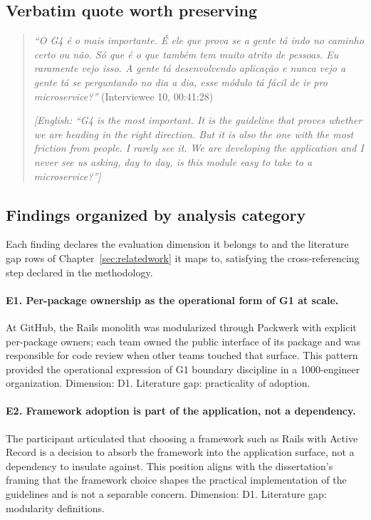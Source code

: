 \subsection*{Verbatim quote worth preserving}

\begin{quote}
\emph{``O G4 é o mais importante. É ele que prova se a gente tá indo no caminho certo ou não. Só que é o que também tem muito atrito de pessoas. Eu raramente vejo isso. A gente tá desenvolvendo aplicação e nunca vejo a gente tá se perguntando no dia a dia, esse módulo tá fácil de ir pro microservice?''} (Interviewee 10, 00:41:28)

\emph{[English: ``G4 is the most important. It is the guideline that proves whether we are heading in the right direction. But it is also the one with the most friction from people. I rarely see it. We are developing the application and I never see us asking, day to day, is this module easy to take to a microservice?'']}
\end{quote}

\subsection*{Findings organized by analysis category}

Each finding declares the evaluation dimension it belongs to and the literature gap rows of Chapter~\ref{sec:relatedwork} it maps to, satisfying the cross-referencing step declared in the methodology.

\paragraph*{E1. Per-package ownership as the operational form of G1 at scale.} At GitHub, the Rails monolith was modularized through Packwerk with explicit per-package owners; each team owned the public interface of its package and was responsible for code review when other teams touched that surface. This pattern provided the operational expression of G1 boundary discipline in a 1000-engineer organization. Dimension: D1. Literature gap: practicality of adoption.

\paragraph*{E2. Framework adoption is part of the application, not a dependency.} The participant articulated that choosing a framework such as Rails with Active Record is a decision to absorb the framework into the application surface, not a dependency to insulate against. This position aligns with the dissertation's framing that the framework choice shapes the practical implementation of the guidelines and is not a separable concern. Dimension: D1. Literature gap: modularity definitions.

